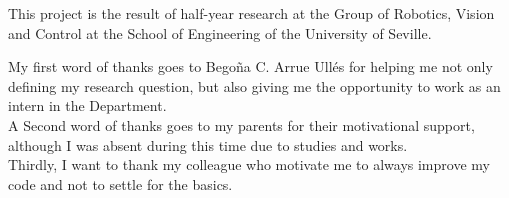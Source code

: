 
This project is the result of half-year research at the Group of Robotics, Vision and Control at the School of Engineering of the University of Seville.


My first word of thanks goes to Bego\~na C. Arrue Ull\'es for helping me not only defining my research question, but also giving me the opportunity to work as an intern in the Department. \\

A Second word of thanks goes to my parents for their motivational support, although I was absent during this time due to studies and works.  \\

Thirdly, I want to thank my colleague who motivate me to always improve my code and not to settle for the basics.  \\

